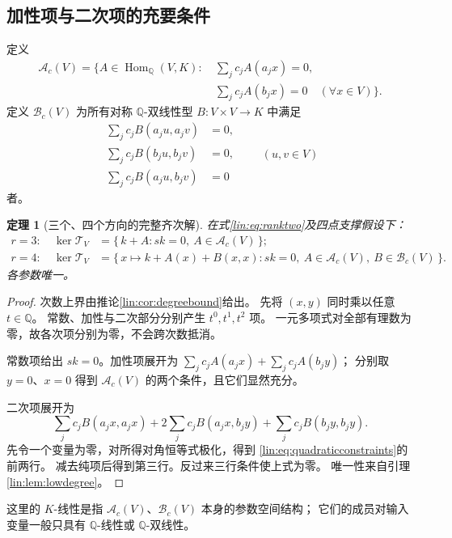 \documentclass[11pt,a4paper,oneside,openany]{book}
\theoremstyle{lecture}
\newtheorem{theorem}{定理}[section]
\newcommand{\Q}{\mathbb Q}
\newcommand{\Hom}{\operatorname{Hom}}
\newcommand{\T}{\mathcal T}
\numberwithin{equation}{section}
\begin{document}
\subsection{加性项与二次项的充要条件}
定义
\[
 \begin{split}
 \mathcal A_c(V)=\{A\in\Hom_{\Q}(V,K):\
 &\sum_j c_jA(a_jx)=0,\\
 &\sum_j c_jA(b_jx)=0\quad(\forall x\in V)\}.
 \end{split}
\]
定义 $\mathcal B_c(V)$ 为所有对称 $\Q$-双线性型
$B:V\times V\to K$ 中满足
\begin{equation}\label{lin:eq:quadraticconstraints}
 \begin{aligned}
 \sum_jc_jB(a_ju,a_jv)&=0,\\
 \sum_jc_jB(b_ju,b_jv)&=0,\\
 \sum_jc_jB(a_ju,b_jv)&=0
 \end{aligned}
 \qquad(u,v\in V)
\end{equation}
者。

\begin{theorem}[三个、四个方向的完整齐次解]\label{lin:thm:exactlowkernel}
在式\eqref{lin:eq:ranktwo}及四点支撑假设下：
\begin{align}
 r=3:\quad
 \ker\T_V&=\{\,k+A:sk=0,\ A\in\mathcal A_c(V)\,\};
 \label{lin:eq:threekernel}\\
 r=4:\quad
 \ker\T_V&=\{\,x\mapsto k+A(x)+B(x,x):
 sk=0,\ A\in\mathcal A_c(V),\ B\in\mathcal B_c(V)\,\}.
 \label{lin:eq:fourkernel}
\end{align}
各参数唯一。
\end{theorem}
\begin{proof}
次数上界由推论\ref{lin:cor:degreebound}给出。
先将 $(x,y)$ 同时乘以任意 $t\in\Q$。
常数、加性与二次部分分别产生 $t^0,t^1,t^2$ 项。
一元多项式对全部有理数为零，故各次项分别为零，不会跨次数抵消。

常数项给出 $sk=0$。加性项展开为
$\sum_jc_jA(a_jx)+\sum_jc_jA(b_jy)$；
分别取 $y=0$、$x=0$ 得到 $\mathcal A_c(V)$ 的两个条件，且它们显然充分。

二次项展开为
\[
 \sum_jc_jB(a_jx,a_jx)
 +2\sum_jc_jB(a_jx,b_jy)
 +\sum_jc_jB(b_jy,b_jy).
\]
先令一个变量为零，对所得对角恒等式极化，得到
\eqref{lin:eq:quadraticconstraints}的前两行。
减去纯项后得到第三行。反过来三行条件使上式为零。
唯一性来自引理\ref{lin:lem:lowdegree}。
\end{proof}

这里的 $K$-线性是指 $\mathcal A_c(V)$、$\mathcal B_c(V)$ 本身的参数空间结构；
它们的成员对输入变量一般只具有 $\Q$-线性或 $\Q$-双线性。
\end{document}
